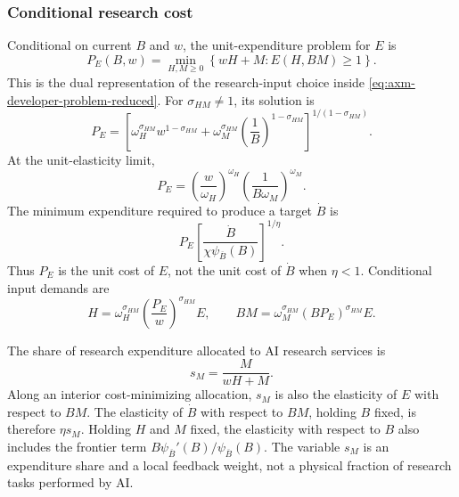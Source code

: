 \subsubsection{Conditional research cost}

Conditional on current \(B\) and \(w\), the unit-expenditure problem for \(E\)
is
\begin{equation}
 P_E(B,w)=\min_{H,M\geq0}\left\{wH+M:E(H,BM)\geq1\right\}.
 \label{eq:axm-research-cost-problem}
\end{equation}
This is the dual representation of the research-input choice inside
\eqref{eq:axm-developer-problem-reduced}. For \(\sigma_{HM}\neq1\), its solution
is
\begin{equation}
 P_E=\left[\omega_H^{\sigma_{HM}}w^{1-\sigma_{HM}}
 +\omega_M^{\sigma_{HM}}\left(\frac{1}{B}\right)^{1-\sigma_{HM}}
 \right]^{1/(1-\sigma_{HM})}.
 \label{eq:axm-research-price}
\end{equation}
At the unit-elasticity limit,
\begin{equation}
 P_E=\left(\frac{w}{\omega_H}\right)^{\omega_H}
 \left(\frac{1}{B\omega_M}\right)^{\omega_M}.
 \label{eq:axm-research-price-cd}
\end{equation}
The minimum expenditure required to produce a target \(\dot B\) is
\begin{equation}
 P_E\left[
  \frac{\dot B}{\chi\psi_{\overline B}(B)}
 \right]^{1/\eta}.
 \label{eq:axm-research-expenditure-function}
\end{equation}
Thus \(P_E\) is the unit cost of \(E\), not the unit cost of \(\dot B\) when
\(\eta<1\). Conditional input demands are
\begin{equation}
 H=\omega_H^{\sigma_{HM}}\left(\frac{P_E}{w}\right)^{\sigma_{HM}}E,
 \qquad
 BM=\omega_M^{\sigma_{HM}}(BP_E)^{\sigma_{HM}}E.
 \label{eq:axm-research-demands}
\end{equation}

The share of research expenditure allocated to AI research services is
\begin{equation}
 s_M=\frac{M}{wH+M}.
 \label{eq:axm-sm}
\end{equation}
Along an interior cost-minimizing allocation, \(s_M\) is also the elasticity of
\(E\) with respect to \(BM\). The elasticity of \(\dot B\) with respect to
\(BM\), holding \(B\) fixed, is therefore \(\eta s_M\). Holding \(H\) and
\(M\) fixed, the elasticity with respect to \(B\) also includes the frontier
term \(B\psi_{\overline B}'(B)/\psi_{\overline B}(B)\). The variable \(s_M\)
is an expenditure share and a local feedback weight, not a physical fraction
of research tasks performed by AI.

